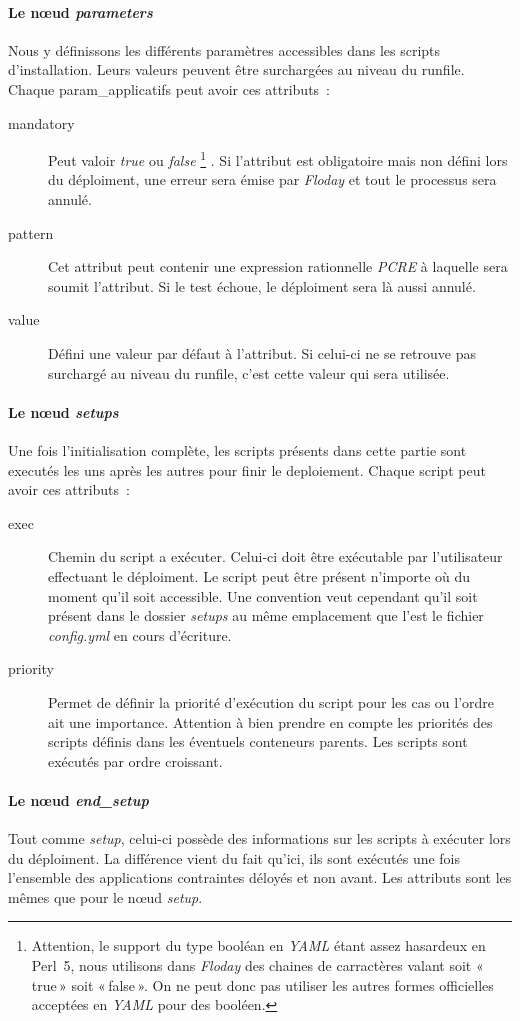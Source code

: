\paragraph{Le nœud \emph{parameters}}
Nous y définissons les différents paramètres accessibles dans les scripts d'installation. Leurs valeurs peuvent être surchargées au niveau du \gls{runfile}.
Chaque \gls{param_applicatifs} peut avoir ces attributs~:
\begin{description}
	\item[mandatory] Peut valoir \emph{true} ou \emph{false}%
		\footnote{Attention, le support du type booléan en \emph{YAML} étant assez hasardeux en Perl~5, nous utilisons dans \emph{Floday} des chaines de carractères valant soit «\,true\,» soit «\,false\,». On ne peut donc pas utiliser les autres formes officielles acceptées en \emph{YAML} pour des booléen.}%
		. Si l'attribut est obligatoire mais non défini lors du déploiment, une erreur sera émise par \emph{Floday} et tout le processus sera annulé.
	\item[pattern] Cet attribut peut contenir une expression rationnelle \emph{PCRE} à laquelle sera soumit l'attribut. Si le test échoue, le déploiment sera là aussi annulé.
	\item[value] Défini une valeur par défaut à l'attribut. Si celui-ci ne se retrouve pas surchargé au niveau du \gls{runfile}, c'est cette valeur qui sera utilisée.
\end{description}

\paragraph{Le nœud \emph{setups}}
Une fois l'\gls{initialisation} complète, les scripts présents dans cette partie sont executés les uns après les autres pour finir le \gls{deploiement}.
Chaque script peut avoir ces attributs~:
\begin{description}
	\item[exec] Chemin du script a exécuter. Celui-ci doit être exécutable par l'utilisateur effectuant le déploiment. Le script peut être présent n'importe où du moment qu'il soit accessible. Une convention veut cependant qu'il soit présent dans le dossier \emph{setups} au même emplacement que l'est le fichier \emph{config.yml} en cours d'écriture.
	\item[priority] Permet de définir la priorité d'exécution du script pour les cas ou l'ordre ait une importance. Attention à bien prendre en compte les priorités des scripts définis dans les éventuels conteneurs parents. Les scripts sont exécutés par ordre croissant.
\end{description}

\paragraph{Le nœud \emph{end\_setup}}
Tout comme \emph{setup}, celui-ci possède des informations sur les scripts à exécuter lors du déploiment.
La différence vient du fait qu'ici, ils sont exécutés une fois l'ensemble des applications contraintes déloyés et non avant.
Les attributs sont les mêmes que pour le nœud \emph{setup}.
